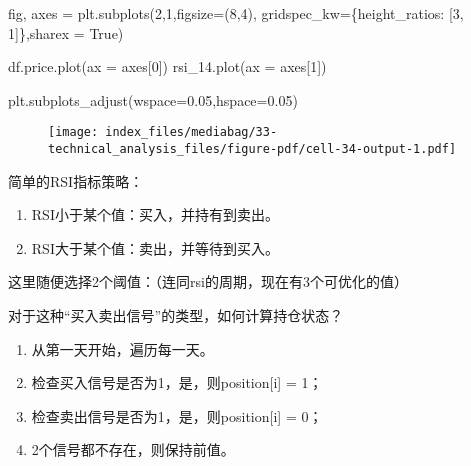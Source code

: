 \documentclass[
  letterpaper,
  DIV=11,
  numbers=noendperiod]{scrreprt}
\newenvironment{Shaded}{\begin{snugshade}}{\end{snugshade}}
\newcommand{\DecValTok}[1]{\textcolor[rgb]{0.68,0.00,0.00}{#1}}
\newcommand{\FloatTok}[1]{\textcolor[rgb]{0.68,0.00,0.00}{#1}}
\newcommand{\NormalTok}[1]{\textcolor[rgb]{0.00,0.23,0.31}{#1}}
\newcommand{\OperatorTok}[1]{\textcolor[rgb]{0.37,0.37,0.37}{#1}}
\newcommand{\StringTok}[1]{\textcolor[rgb]{0.13,0.47,0.30}{#1}}
\newcommand{\VariableTok}[1]{\textcolor[rgb]{0.07,0.07,0.07}{#1}}
\providecommand{\tightlist}{%
  \setlength{\itemsep}{0pt}\setlength{\parskip}{0pt}}\usepackage{longtable,booktabs,array}
\begin{document}
\begin{Shaded}
\begin{Highlighting}[]
\NormalTok{fig, axes }\OperatorTok{=}\NormalTok{ plt.subplots(}\DecValTok{2}\NormalTok{,}\DecValTok{1}\NormalTok{,figsize}\OperatorTok{=}\NormalTok{(}\DecValTok{8}\NormalTok{,}\DecValTok{4}\NormalTok{), gridspec\_kw}\OperatorTok{=}\NormalTok{\{}\StringTok{\textquotesingle{}height\_ratios\textquotesingle{}}\NormalTok{: [}\DecValTok{3}\NormalTok{, }\DecValTok{1}\NormalTok{]\},sharex }\OperatorTok{=} \VariableTok{True}\NormalTok{)}

\NormalTok{df.price.plot(ax }\OperatorTok{=}\NormalTok{ axes[}\DecValTok{0}\NormalTok{])}
\NormalTok{rsi\_14.plot(ax }\OperatorTok{=}\NormalTok{ axes[}\DecValTok{1}\NormalTok{])}

\NormalTok{plt.subplots\_adjust(wspace}\OperatorTok{=}\FloatTok{0.05}\NormalTok{,hspace}\OperatorTok{=}\FloatTok{0.05}\NormalTok{)}
\end{Highlighting}
\end{Shaded}

\begin{figure}[H]

{\centering \texttt{[image: index\_files/mediabag/33-technical\_analysis\_files/figure-pdf/cell-34-output-1.pdf]}

}

\end{figure}

简单的RSI指标策略：

\begin{enumerate}
\def\labelenumi{\arabic{enumi}.}
\tightlist
\item
  RSI小于某个值：买入，并持有到卖出。
\item
  RSI大于某个值：卖出，并等待到买入。
\end{enumerate}

这里随便选择2个阈值：（连同rsi的周期，现在有3个可优化的值）

对于这种``买入卖出信号''的类型，如何计算持仓状态？

\begin{enumerate}
\def\labelenumi{\arabic{enumi}.}
\tightlist
\item
  从第一天开始，遍历每一天。
\item
  检查买入信号是否为1，是，则position{[}i{]} = 1；
\item
  检查卖出信号是否为1，是，则position{[}i{]} = 0；
\item
  2个信号都不存在，则保持前值。
\end{enumerate}
\end{document}
